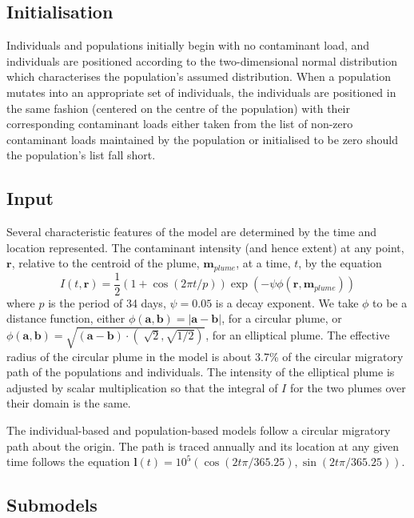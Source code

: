 \subsection{Initialisation}

Individuals and populations initially begin with no contaminant load, and
individuals are positioned according to the two-dimensional normal
distribution which characterises the population's assumed distribution. When a
population mutates into an appropriate set of individuals, the individuals are
positioned in the same fashion (centered on the centre of the population) with
their corresponding contaminant loads either taken from the list of non-zero
contaminant loads maintained by the population or initialised to be zero
should the population's list fall short.

\subsection{Input\label{Circle-and-plume}}

Several characteristic features of the model are determined by the time and
location represented. The contaminant intensity (and hence extent) at any
point, $\mathbf{r}$, relative to the centroid of the plume,
$\mathbf{m}_{{plume}}$, at a time, $t$, by the equation
\[ I (t, \mathbf{r}) = \frac{1}{2} (1 + \cos (2 \pi t / p)) \exp (- \psi \phi ( \mathbf{r}, \mathbf{m}_{{plume}})) \]
where $p$ is the period of 34 days, $\psi = 0.05$ is a decay exponent. We take
$\phi$ to be a distance function, either $\phi ( \mathbf{a}, \mathbf{b}) = | \mathbf{a} - \mathbf{b} |$, for a circular plume, or
$\phi ( \mathbf{a}, \mathbf{b}) = \sqrt{ ( \mathbf{a} - \mathbf{b}) \cdot ( \sqrt[]{2}, \sqrt{1 / 2})}^{}$, for an elliptical plume. The effective radius of
the circular plume in the model is about 3.7\% of the circular migratory path
of the populations and individuals. The intensity of the elliptical plume is
adjusted by scalar multiplication so that the integral of $I$ for the two
plumes over their domain is the same.

The individual-based and population-based models follow a circular migratory
path about the origin. The path is traced annually and its location at any
given time follows the equation $\mathbf{l} \left( t \right) = 10^5 \left( \cos \left( 2 t \pi / 365.25 \right), \sin \left( 2 t \pi / 365.25\right) \right)$.

\subsection{Submodels}

